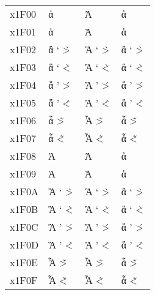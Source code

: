 \documentclass[a4paper]{article}
\newcommand*{\Greek}{\foreignlanguage{greek}}
\newcommand*{\Greek}{\ensuregreek}
\newcommand*{\Cases}[1]{%
  & \Greek{#1} & \Greek{\MakeUppercase{#1}} & \Greek{\MakeLowercase{#1}}
}
\begin{document}
\begin{longtable}{llll}
  x1F00 \Cases{ ἀ  \accpsili{\alpha}                            \>{\alpha}                                             } \\
  x1F01 \Cases{ ἁ  \accdasia{\alpha}                            \<{\alpha}                                             } \\
  x1F02 \Cases{ ἂ  \accpsilivaria{\alpha}                       \>`{\alpha}                 \`>{\alpha}                } \\
  x1F03 \Cases{ ἃ  \accdasiavaria{\alpha}                       \<`{\alpha}                 \`<{\alpha}                } \\
  x1F04 \Cases{ ἄ  \accpsilioxia{\alpha}                        \>'{\alpha}                 \'>{\alpha}                } \\
  x1F05 \Cases{ ἅ  \accdasiaoxia{\alpha}                        \<'{\alpha}                 \'<{\alpha}                } \\
  x1F06 \Cases{ ἆ  \accpsiliperispomeni{\alpha}                 \~>{\alpha}                 \>~{\alpha}                } \\
  x1F07 \Cases{ ἇ  \accdasiaperispomeni{\alpha}                 \~<{\alpha}                 \<~{\alpha}                } \\
  x1F08 \Cases{ Ἀ  \accpsili{\Alpha}                            \>{\Alpha}                                             } \\
  x1F09 \Cases{ Ἁ  \accdasia{\Alpha}                            \<{\Alpha}                                             } \\
  x1F0A \Cases{ Ἂ  \accpsilivaria{\Alpha}                       \>`{\Alpha}                 \`>{\Alpha}                } \\
  x1F0B \Cases{ Ἃ  \accdasiavaria{\Alpha}                       \<`{\Alpha}                 \`<{\Alpha}                } \\
  x1F0C \Cases{ Ἄ  \accpsilioxia{\Alpha}                        \>'{\Alpha}                 \'>{\Alpha}                } \\
  x1F0D \Cases{ Ἅ  \accdasiaoxia{\Alpha}                        \<'{\Alpha}                 \'<{\Alpha}                } \\
  x1F0E \Cases{ Ἆ  \accpsiliperispomeni{\Alpha}                 \~>{\Alpha}                 \>~{\Alpha}                } \\
  x1F0F \Cases{ Ἇ  \accdasiaperispomeni{\Alpha}                 \~<{\Alpha}                 \<~{\Alpha}                } \\

\end{longtable}
\end{document}
